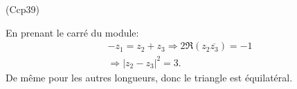 \begin{tiny}(Ccp39)\end{tiny} En prenant le carré du module:
\begin{multline*}
  -z_1 = z_2 + z_3 \Rightarrow 2 \Re(z_2 \overline{z_3}) = -1\\
  \Rightarrow |z_2 - z_3|^2 = 3.
\end{multline*}
De même pour les autres longueurs, donc le triangle est équilatéral.
